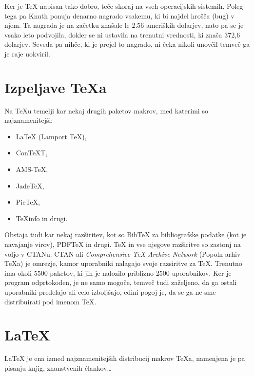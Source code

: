 \documentclass[a4paper]{book}
\begin{document}
Ker je \TeX{} napisan tako dobro, teče skoraj na vseh operacijskih sistemih. Poleg tega pa Knuth ponuja denarno nagrado vsakemu, ki bi najdel hrošča (bug) v njem. Ta nagrada je na začetku znašale le 2.56 ameriških dolarjev, nato pa se je vsako leto podvojila, dokler se ni ustavila na trenutni vrednosti, ki znaša 372,6 dolarjev. Seveda pa nihče, ki je prejel to nagrado, ni čeka nikoli unovčil temveč ga je raje uokviril.


\chapter{Izpeljave \TeX{}a}
Na \TeX{}u temelji kar nekaj drugih paketov makrov, med katerimi so najznamenitejši:
\begin{itemize}
\item \LaTeX{} (Lamport \TeX{}),
\item Con\TeX{}T,
\item AMS-\TeX{},
\item Jade\TeX{},
\item Pic\TeX{},
\item \TeX{}info in drugi.
\end{itemize}

Obstaja tudi kar nekaj razširitev, kot so Bib\TeX{} za bibliografske podatke (kot je navajanje virov), PDF\TeX{} in drugi.
\TeX{} in vse njegove razširitve so zastonj na voljo v CTANu. CTAN ali \textit{Comprehensive \TeX{} Archive Network} (Popoln arhiv \TeX{}a) je omrezje, kamor uporabniki nalagajo svoje razsiritve za \TeX{}. Trenutno ima okoli 5500 paketov, ki jih je nalozilo priblizno 2500 uporabnikov.
Ker je program odprtokoden, je ne samo mogoče, temveč tudi zaželjeno, da ga ostali uporabniki predelajo ali celo izboljšajo, edini pogoj je, da se ga ne sme distribuirati pod imenom \TeX{}.


\chapter{\LaTeX{}}
\LaTeX{} je ena izmed najznamenitejših distribucij makrov \TeX{}a, namenjena je pa pisanju knjig, znanstvenih člankov\ldots

\end{document}
